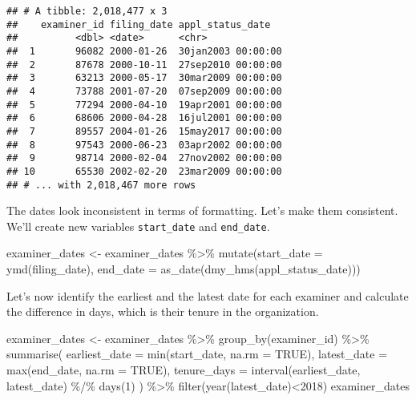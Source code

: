 \documentclass[
]{article}
\newenvironment{Shaded}{\begin{snugshade}}{\end{snugshade}}
\newcommand{\AttributeTok}[1]{\textcolor[rgb]{0.77,0.63,0.00}{#1}}
\newcommand{\ConstantTok}[1]{\textcolor[rgb]{0.00,0.00,0.00}{#1}}
\newcommand{\DecValTok}[1]{\textcolor[rgb]{0.00,0.00,0.81}{#1}}
\newcommand{\FunctionTok}[1]{\textcolor[rgb]{0.00,0.00,0.00}{#1}}
\newcommand{\NormalTok}[1]{#1}
\newcommand{\OtherTok}[1]{\textcolor[rgb]{0.56,0.35,0.01}{#1}}
\newcommand{\SpecialCharTok}[1]{\textcolor[rgb]{0.00,0.00,0.00}{#1}}
\begin{document}
\begin{verbatim}
## # A tibble: 2,018,477 x 3
##    examiner_id filing_date appl_status_date  
##          <dbl> <date>      <chr>             
##  1       96082 2000-01-26  30jan2003 00:00:00
##  2       87678 2000-10-11  27sep2010 00:00:00
##  3       63213 2000-05-17  30mar2009 00:00:00
##  4       73788 2001-07-20  07sep2009 00:00:00
##  5       77294 2000-04-10  19apr2001 00:00:00
##  6       68606 2000-04-28  16jul2001 00:00:00
##  7       89557 2004-01-26  15may2017 00:00:00
##  8       97543 2000-06-23  03apr2002 00:00:00
##  9       98714 2000-02-04  27nov2002 00:00:00
## 10       65530 2002-02-20  23mar2009 00:00:00
## # ... with 2,018,467 more rows
\end{verbatim}

The dates look inconsistent in terms of formatting. Let's make them
consistent. We'll create new variables \texttt{start\_date} and
\texttt{end\_date}.

\begin{Shaded}
\begin{Highlighting}[]
\NormalTok{examiner\_dates }\OtherTok{\textless{}{-}}\NormalTok{ examiner\_dates }\SpecialCharTok{\%\textgreater{}\%} 
  \FunctionTok{mutate}\NormalTok{(}\AttributeTok{start\_date =} \FunctionTok{ymd}\NormalTok{(filing\_date), }\AttributeTok{end\_date =} \FunctionTok{as\_date}\NormalTok{(}\FunctionTok{dmy\_hms}\NormalTok{(appl\_status\_date)))}
\end{Highlighting}
\end{Shaded}

Let's now identify the earliest and the latest date for each examiner
and calculate the difference in days, which is their tenure in the
organization.

\begin{Shaded}
\begin{Highlighting}[]
\NormalTok{examiner\_dates }\OtherTok{\textless{}{-}}\NormalTok{ examiner\_dates }\SpecialCharTok{\%\textgreater{}\%} 
  \FunctionTok{group\_by}\NormalTok{(examiner\_id) }\SpecialCharTok{\%\textgreater{}\%} 
  \FunctionTok{summarise}\NormalTok{(}
    \AttributeTok{earliest\_date =} \FunctionTok{min}\NormalTok{(start\_date, }\AttributeTok{na.rm =} \ConstantTok{TRUE}\NormalTok{), }
    \AttributeTok{latest\_date =} \FunctionTok{max}\NormalTok{(end\_date, }\AttributeTok{na.rm =} \ConstantTok{TRUE}\NormalTok{),}
    \AttributeTok{tenure\_days =} \FunctionTok{interval}\NormalTok{(earliest\_date, latest\_date) }\SpecialCharTok{\%/\%} \FunctionTok{days}\NormalTok{(}\DecValTok{1}\NormalTok{)}
\NormalTok{    ) }\SpecialCharTok{\%\textgreater{}\%} 
  \FunctionTok{filter}\NormalTok{(}\FunctionTok{year}\NormalTok{(latest\_date)}\SpecialCharTok{\textless{}}\DecValTok{2018}\NormalTok{)}
\NormalTok{examiner\_dates}
\end{Highlighting}
\end{Shaded}
\end{document}
